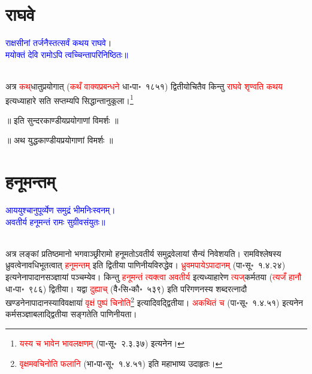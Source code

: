\section[राघवे]{राघवे}
\centering\textcolor{blue}{राक्षसीनां तर्जनैस्तत्सर्वं कथय राघवे।\nopagebreak\\
मयोक्तं देवि रामोऽपि त्वच्चिन्तापरिनिष्ठितः॥}\nopagebreak\\
\\
\begin{sloppypar}\justifying\noindent\hspace{10mm} अत्र \textcolor{red}{कथ्‌}\-धातु\-प्रयोगात् (\textcolor{red}{कथँ वाक्य\-प्रबन्धने} धा॰पा॰~१८५१) द्वितीयोचितैव किन्तु \textcolor{red}{राघवे शृण्वति कथय} इत्यध्याहारे सति सप्तम्यपि सिद्धान्तानुकूला।\footnote{\textcolor{red}{यस्य च भावेन भाव\-लक्षणम्‌} (पा॰सू॰~२.३.३७) इत्यनेन।}\end{sloppypar}
\vspace{2mm}
\centering ॥ इति सुन्दरकाण्डीयप्रयोगाणां विमर्शः ॥\nopagebreak\\
\vspace{4mm}
{}
\centering ॥ अथ युद्धकाण्डीयप्रयोगाणां विमर्शः ॥\nopagebreak\\
\section[हनूमन्तम्]{हनूमन्तम्‌}
\centering\textcolor{blue}{आययुश्चानुपूर्व्येण समुद्रं भीमनिःस्वनम्।\nopagebreak\\
अवतीर्य हनूमन्तं रामः सुग्रीवसंयुतः॥}\nopagebreak\\
\\
\begin{sloppypar}\justifying\noindent\hspace{10mm} अत्र लङ्कां प्रतिष्ठमानो भगवाञ्छ्रीरामो हनूमतोऽवतीर्य समुद्र\-वेलायां सैन्यं निवेशयति। राम\-विश्लेषस्य ध्रुवत्वेनावधि\-भूतत्वात् \textcolor{red}{हनूमन्तम्‌} इति द्वितीया पाणिनीय\-विरुद्धेव। \textcolor{red}{ध्रुवमपायेऽपादानम्‌} (पा॰सू॰~१.४.२४) इत्यनेनापादान\-सञ्ज्ञायां पञ्चम्येव। किन्तु \textcolor{red}{हनूमन्तं त्यक्त्वा अवतीर्य} इत्यध्याहारेण \textcolor{red}{त्यज्‌}\-कर्मतया (\textcolor{red}{त्यजँ हानौ} धा॰पा॰~९८६) द्वितीया। यद्वा \textcolor{red}{दुह्याच्‌} (वै॰सि॰कौ॰~५३९) इति परिगणनस्य शब्दरत्नादौ
खण्डनेनापादानस्याविवक्षायां \textcolor{red}{वृक्षं पुष्पं चिनोति}\footnote{\textcolor{red}{वृक्षमवचिनोति फलानि} (भा॰पा॰सू॰~१.४.५१) इति महाभाष्य उदाहृतः।} 
इत्यादिवद्द्वितीया।
\textcolor{red}{अकथितं च} (पा॰सू॰~१.४.५१) इत्यनेन कर्म\-सञ्ज्ञा\-बलाद्द्वितीया सङ्गतेति पाणिनीयता।\end{sloppypar}

